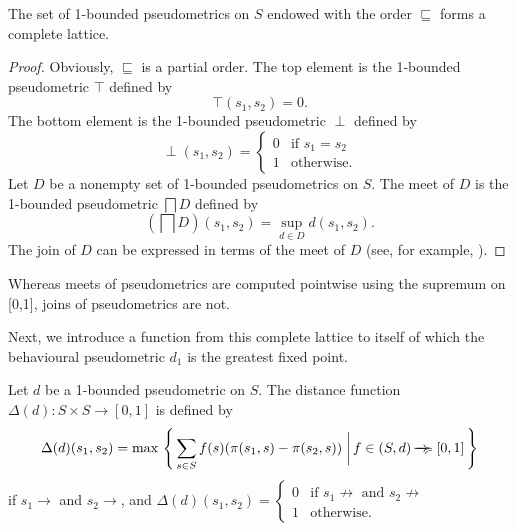 \documentclass{LMCS}
\newcommand{\ndi}{\mathbin{\raisebox{0.15ex}{-\hspace{-0.2em}-\hspace{-0.2em}-\hspace{-0.2em}-\hspace{-0.2em}-\hspace{-0.2em}-}\hspace{-0.7em}\succcurlyeq}}
\newcommand{\bottom}{\perp}
\newcommand{\bigmid}{\; \bigg| \,}
\begin{document}
\begin{prop}
\label{proposition:3}
The set of 1-bounded pseudometrics on $S$ endowed with the order
$\sqsubseteq$ forms a complete lattice.
\end{prop}
\begin{proof}
Obviously, $\sqsubseteq$ is a partial order.  The top element is
the 1-bounded pseudometric $\top$ defined by
\begin{displaymath}
\top(s_1, s_2) = 0.
\end{displaymath}
The bottom element is the 1-bounded pseudometric $\bottom$ defined by
\begin{displaymath}
\bottom(s_1, s_2) = \left \{
\begin{array}{ll}
0 & \mbox{if $s_1 = s_2$}\\
1 & \mbox{otherwise.}
\end{array}
\right .
\end{displaymath}
Let $D$ be a nonempty set of 1-bounded pseudometrics on $S$.  The
meet of $D$ is the 1-bounded pseudometric $\bigsqcap D$ defined by
\begin{displaymath}
(\bigsqcap D)(s_1, s_2)
=
\sup_{d \in D} d(s_1, s_2).
\end{displaymath}
The join of $D$ can be expressed in terms of the meet of $D$
(see, for example, \cite[Lemma~2.15]{DP90}).
\end{proof}

Whereas meets of pseudometrics are computed pointwise using the supremum
on [0,1], joins of pseudometrics are not.

Next, we introduce a function from this complete lattice to itself
of which the behavioural pseudometric $d_1$ is the greatest fixed point.

\begin{defi}
\label{definition:9}
Let $d$ be a 1-bounded pseudometric on $S$.  The
distance function $\Delta(d) : S \times S \to [0, 1]$ is defined by
\begin{displaymath}
\Delta(d)(s_1, s_2)
=
\max\, \left \{\, \sum_{s \in S} f(s) (\pi(s_1, s) - \pi(s_2, s)) \bigmid f \in (S, d) \ndi [0, 1] \, \right \}
\end{displaymath}
if $s_1 \rightarrow$ and $s_2 \rightarrow$, and
$
\Delta(d)(s_1, s_2) = \left \{
\begin{array}{ll}
0
& \mbox{if $s_1 \not\rightarrow$ and $s_2 \not\rightarrow$}\\
1
& \mbox{otherwise.}
\end{array}
\right .  $ 
\end{defi}
\end{document}
